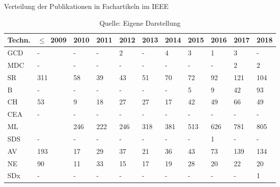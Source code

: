 \begin{table}
	\caption{Verteilung der Publikationen in Fachartikeln im \glqq \ac{IEEE}\grqq}
	\selectfont
	\footnotesize
	\centering
	\label{tab:dist_ieee_art}
\begin{tabularx}{\linewidth}{XXXXXXXXXXX}
	\hline
	Techn. & $\leq$~2009 & 2010 & 2011 & 2012 & 2013 & 2014 & 2015 & 2016 & 2017 & 2018 \\
	\hline
	\acs{GCD} & - & - & - & 2 & - & 4 & 3 & 1 & 3 & - \\
	\acs{MDC} & - & - & - & - & - & - & - & - & 2 & 2 \\
	\acs{SR} & 311 & 58 & 39 & 43 & 51 & 70 & 72 & 92 & 121 & 104 \\
	\acs{B} & - & - & - & - & - & - & 5 & 9 & 42 & 93 \\
	\acs{CH} & 53 & 9 & 18 & 27 & 27 & 17 & 42 & 49 & 66 & 49 \\
	\acs{CEA} & - & - & - & - & - & - & - & - & - & - \\
	\acs{ML} & \numprint{1551} & 246 & 222 & 246 & 318 & 381 & 513 & 626 & 781 & 805 \\
	\acs{SDS} & - & - & - & - & - & - & - & 1 & - & - \\
	\acs{AV} & 193 & 17 & 29 & 37 & 21 & 36 & 43 & 73 & 139 & 134 \\
	\acs{NE} & 90 & 11 & 33 & 15 & 17 & 19 & 28 & 20 & 22 & 20 \\
	\acs{SDx} & - & - & - & - & - & - & - & - & - & 1 \\
	\hline
\end{tabularx}
\caption*{Quelle: Eigene Darstellung}
\end{table}

